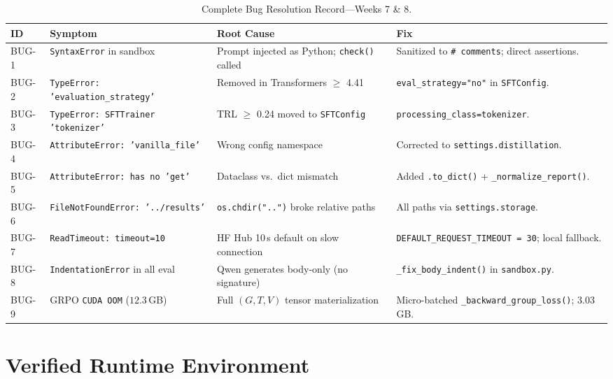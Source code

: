 \documentclass[12pt, a4paper]{article}
\begin{document}
\begin{table}[H]
\centering
\scriptsize
\caption{Complete Bug Resolution Record---Weeks 7 \& 8.}
\label{tab:bug_postmortem}
\begin{tabularx}{\textwidth}{l p{3.2cm} p{3.6cm} X}
\toprule
\textbf{ID} & \textbf{Symptom} & \textbf{Root Cause} & \textbf{Fix} \\
\midrule
BUG-1 & \texttt{SyntaxError} in sandbox   & Prompt injected as Python; \texttt{check()} called & Sanitized to \texttt{\# comments}; direct assertions. \\
BUG-2 & \texttt{TypeError: 'evaluation\_strategy'} & Removed in Transformers $\geq$ 4.41 & \texttt{eval\_strategy="no"} in \texttt{SFTConfig}. \\
BUG-3 & \texttt{TypeError: SFTTrainer 'tokenizer'} & TRL $\geq$ 0.24 moved to \texttt{SFTConfig} & \texttt{processing\_class=tokenizer}. \\
BUG-4 & \texttt{AttributeError: 'vanilla\_file'} & Wrong config namespace & Corrected to \texttt{settings.distillation}. \\
BUG-5 & \texttt{AttributeError: has no 'get'}  & Dataclass vs.\ dict mismatch & Added \texttt{.to\_dict()} + \texttt{\_normalize\_report()}. \\
BUG-6 & \texttt{FileNotFoundError: '../results'} & \texttt{os.chdir("..")} broke relative paths & All paths via \texttt{settings.storage}. \\
BUG-7 & \texttt{ReadTimeout: timeout=10}       & HF Hub 10\,s default on slow connection & \texttt{DEFAULT\_REQUEST\_TIMEOUT = 30}; local fallback. \\
BUG-8 & \texttt{IndentationError} in all eval  & Qwen generates body-only (no signature) \cite{qwen25coder} & \texttt{\_fix\_body\_indent()} in \texttt{sandbox.py}. \\
BUG-9 & GRPO \texttt{CUDA OOM} ($12.3$\,GB)   & Full $(G,T,V)$ tensor materialization \cite{grpo_deepseek} & Micro-batched \texttt{\_backward\_group\_loss()}; $3.03$\,GB. \\
\bottomrule
\end{tabularx}
\end{table}

\section{Verified Runtime Environment}
\end{document}
